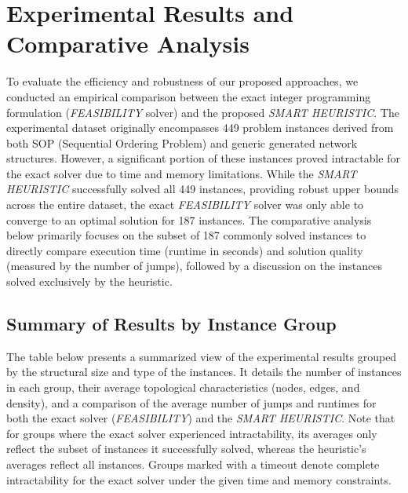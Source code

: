 \section{Experimental Results and Comparative Analysis}
\label{sec:experimental_results}

To evaluate the efficiency and robustness of our proposed approaches, we conducted an empirical comparison between the exact integer programming formulation (\textit{FEASIBILITY} solver) and the proposed \textit{SMART HEURISTIC}. The experimental dataset originally encompasses 449 problem instances derived from both SOP (Sequential Ordering Problem) and generic generated network structures. However, a significant portion of these instances proved intractable for the exact solver due to time and memory limitations. While the \textit{SMART HEURISTIC} successfully solved all 449 instances, providing robust upper bounds across the entire dataset, the exact \textit{FEASIBILITY} solver was only able to converge to an optimal solution for 187 instances. The comparative analysis below primarily focuses on the subset of 187 commonly solved instances to directly compare execution time (runtime in seconds) and solution quality (measured by the number of jumps), followed by a discussion on the instances solved exclusively by the heuristic.

\subsection{Summary of Results by Instance Group}

The table below presents a summarized view of the experimental results grouped by the structural size and type of the instances. It details the number of instances in each group, their average topological characteristics (nodes, edges, and density), and a comparison of the average number of jumps and runtimes for both the exact solver (\textit{FEASIBILITY}) and the \textit{SMART HEURISTIC}. Note that for groups where the exact solver experienced intractability, its averages only reflect the subset of instances it successfully solved, whereas the heuristic's averages reflect all instances. Groups marked with a timeout denote complete intractability for the exact solver under the given time and memory constraints.

